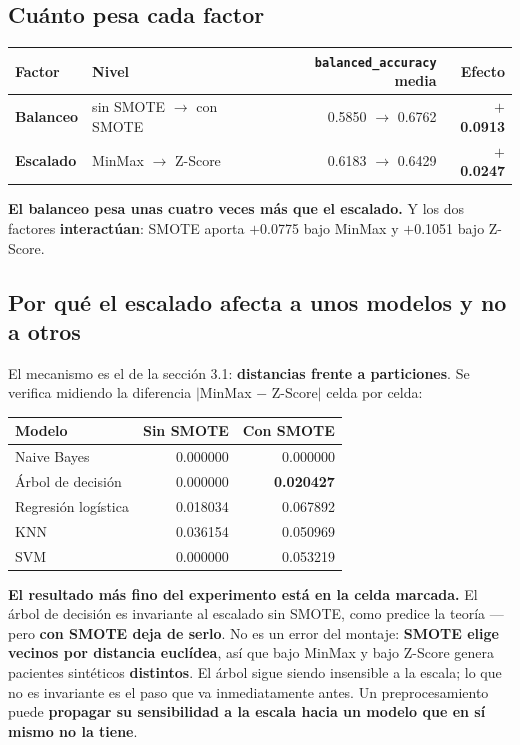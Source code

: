 \documentclass[10pt,a4paper]{article}
\begin{document}
\subsection{Cuánto pesa cada factor}

\begin{table}[H]
\footnotesize
\centering
\begin{tabular}{@{}l l r r@{}}
\toprule
\textbf{Factor} & \textbf{Nivel} & \textbf{\texttt{balanced\_accuracy} media} & \textbf{Efecto} \\
\midrule
\textbf{Balanceo} & sin SMOTE $\rightarrow$ con SMOTE & 0.5850 $\rightarrow$ 0.6762 & \textbf{$+$0.0913} \\
\textbf{Escalado} & MinMax $\rightarrow$ Z-Score & 0.6183 $\rightarrow$ 0.6429 & \textbf{$+$0.0247} \\
\bottomrule
\end{tabular}
\end{table}

\textbf{El balanceo pesa unas cuatro veces más que el escalado.} Y los dos factores \textbf{interactúan}: SMOTE aporta $+$0.0775 bajo MinMax y $+$0.1051 bajo Z-Score.

\subsection{Por qué el escalado afecta a unos modelos y no a otros}

El mecanismo es el de la sección 3.1: \textbf{distancias frente a particiones}. Se verifica midiendo la diferencia $|$MinMax $-$ Z-Score$|$ celda por celda:

\begin{table}[H]
\footnotesize
\centering
\begin{tabular}{@{}l r r@{}}
\toprule
\textbf{Modelo} & \textbf{Sin SMOTE} & \textbf{Con SMOTE} \\
\midrule
Naive Bayes & 0.000000 & 0.000000 \\
Árbol de decisión & 0.000000 & \textbf{0.020427} \\
Regresión logística & 0.018034 & 0.067892 \\
KNN & 0.036154 & 0.050969 \\
SVM & 0.000000 & 0.053219 \\
\bottomrule
\end{tabular}
\end{table}

\textbf{El resultado más fino del experimento está en la celda marcada.} El árbol de decisión es invariante al escalado sin SMOTE, como predice la teoría --- pero \textbf{con SMOTE deja de serlo}. No es un error del montaje: \textbf{SMOTE elige vecinos por distancia euclídea}, así que bajo MinMax y bajo Z-Score genera pacientes sintéticos \textbf{distintos}. El árbol sigue siendo insensible a la escala; lo que no es invariante es el paso que va inmediatamente antes. Un preprocesamiento puede \textbf{propagar su sensibilidad a la escala hacia un modelo que en sí mismo no la tiene}.
\end{document}
